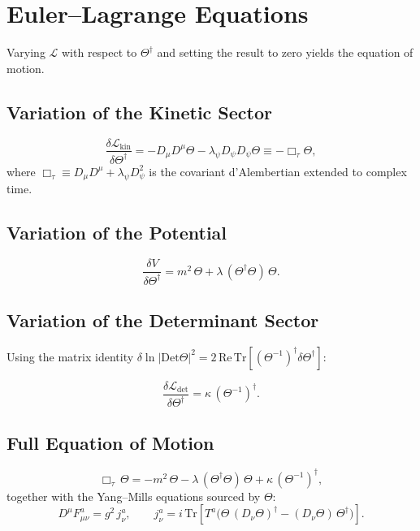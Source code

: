 \documentclass[12pt]{article}
\newcommand{\Tr}{\mathrm{Tr}}
\newcommand{\Det}{\mathrm{Det}}
\newcommand{\Lag}{\mathcal{L}}
\begin{document}
\section{Euler--Lagrange Equations}

Varying $\Lag$ with respect to $\Theta^\dagger$ and setting the result to zero
yields the equation of motion.

\subsection{Variation of the Kinetic Sector}

\[
  \frac{\delta\Lag_{\mathrm{kin}}}{\delta\Theta^\dagger}
  = -D_\mu D^\mu \Theta - \lambda_\psi D_\psi D_\psi \Theta
  \equiv -\Box_\tau\Theta,
\]
where $\Box_\tau \equiv D_\mu D^\mu + \lambda_\psi D_\psi^2$ is the
covariant d'Alembertian extended to complex time.

\subsection{Variation of the Potential}

\[
  \frac{\delta V}{\delta\Theta^\dagger}
  = m^2\,\Theta + \lambda\,(\Theta^\dagger\Theta)\,\Theta.
\]

\subsection{Variation of the Determinant Sector}

Using the matrix identity $\delta\ln|\Det\Theta|^2 = 2\,\mathrm{Re}\,\Tr[(\Theta^{-1})^\dagger\delta\Theta^\dagger]$:

\[
  \frac{\delta\Lag_{\mathrm{det}}}{\delta\Theta^\dagger}
  = \kappa\,(\Theta^{-1})^\dagger.
\]

\subsection{Full Equation of Motion}

\begin{equation}
  \Box_\tau\,\Theta
  = -m^2\,\Theta
  - \lambda\,(\Theta^\dagger\Theta)\,\Theta
  + \kappa\,(\Theta^{-1})^\dagger,
  \label{eq:EOM}
\end{equation}
together with the Yang--Mills equations sourced by $\Theta$:
\begin{equation}
  D^\mu F_{\mu\nu}^a
  = g^2\,j_\nu^a,
  \qquad
  j_\nu^a = i\,\Tr\!\left[T^a\bigl(\Theta\,(D_\nu\Theta)^\dagger
    - (D_\nu\Theta)\,\Theta^\dagger\bigr)\right].
  \label{eq:YM_EOM}
\end{equation}
\end{document}
